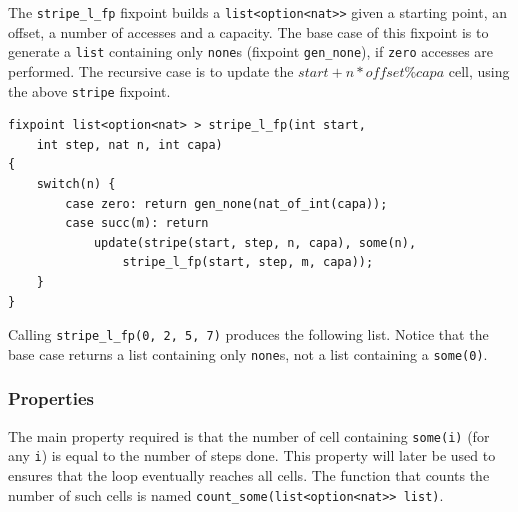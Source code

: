 \documentclass[oneside]{article}
\begin{document}
The \texttt{stripe\_l\_fp} fixpoint builds a \texttt{list<option<nat>>} given a starting point, an offset, a number of accesses and a capacity. The base case of this fixpoint is to generate a \texttt{list} containing only \texttt{none}s (fixpoint \texttt{gen\_none}), if \texttt{zero} accesses are performed. The recursive case is to update the $start + n*offset \%capa$ cell, using the above \texttt{stripe} fixpoint. 

\begin{definition}
	\begin{lstlisting}
fixpoint list<option<nat> > stripe_l_fp(int start,
	int step, nat n, int capa)
{
	switch(n) {
		case zero: return gen_none(nat_of_int(capa));
		case succ(m): return 
			update(stripe(start, step, n, capa), some(n), 
				stripe_l_fp(start, step, m, capa));
	}
}
 	\end{lstlisting}
\end{definition}

\begin{example}
	Calling \texttt{stripe\_l\_fp(0, 2, 5, 7)} produces the following list. Notice that the base case returns a list containing only \texttt{none}s, not a list containing a \texttt{some(0)}. 
	\begin{center}
	\end{center}
\end{example}


\subsubsection{Properties}
The main property required is that the number of cell containing \texttt{some(i)} (for any \texttt{i}) is equal to the number of steps done. This property will later be used to ensures that the loop eventually reaches all cells. The function that counts the number of such cells is named \texttt{count\_some(list<option<nat>> list)}.
\end{document}
